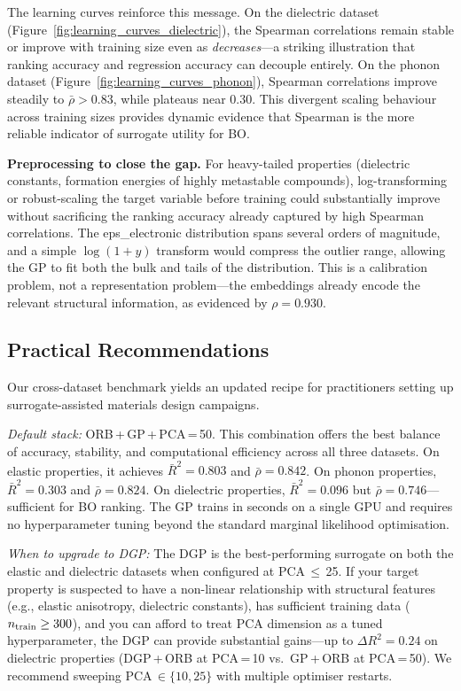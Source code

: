 The learning curves reinforce this message.
On the dielectric dataset (Figure~\ref{fig:learning_curves_dielectric}), the Spearman correlations remain stable or improve with training size even as \Rtwo{} \emph{decreases}---a striking illustration that ranking accuracy and regression accuracy can decouple entirely.
On the phonon dataset (Figure~\ref{fig:learning_curves_phonon}), Spearman correlations improve steadily to $\bar{\rho} > 0.83$, while \Rtwo{} plateaus near $0.30$.
This divergent scaling behaviour across training sizes provides dynamic evidence that Spearman is the more reliable indicator of surrogate utility for BO.

\textbf{Preprocessing to close the gap.}
For heavy-tailed properties (dielectric constants, formation energies of highly metastable compounds), log-transforming or robust-scaling the target variable before training could substantially improve \Rtwo{} without sacrificing the ranking accuracy already captured by high Spearman correlations.
The eps\_electronic distribution spans several orders of magnitude, and a simple $\log(1 + y)$ transform would compress the outlier range, allowing the GP to fit both the bulk and tails of the distribution.
This is a calibration problem, not a representation problem---the embeddings already encode the relevant structural information, as evidenced by $\rho = 0.930$.

\FloatBarrier
\subsection{Practical Recommendations}
\label{sec:practical_recommendations}

Our cross-dataset benchmark yields an updated recipe for practitioners setting up surrogate-assisted materials design campaigns.

\emph{Default stack:} ORB\,+\,GP\,+\,PCA\,=\,50.
This combination offers the best balance of accuracy, stability, and computational efficiency across all three datasets.
On elastic properties, it achieves $\bar{R}^2 = 0.803$ and $\bar{\rho} = 0.842$.
On phonon properties, $\bar{R}^2 = 0.303$ and $\bar{\rho} = 0.824$.
On dielectric properties, $\bar{R}^2 = 0.096$ but $\bar{\rho} = 0.746$---sufficient for BO ranking.
The GP trains in seconds on a single GPU and requires no hyperparameter tuning beyond the standard marginal likelihood optimisation.

\emph{When to upgrade to DGP:} The DGP is the best-performing surrogate on both the elastic and dielectric datasets when configured at PCA\,$\leq$\,25.
If your target property is suspected to have a non-linear relationship with structural features (e.g., elastic anisotropy, dielectric constants), has sufficient training data ($n_{\text{train}} \geq 300$), and you can afford to treat PCA dimension as a tuned hyperparameter, the DGP can provide substantial gains---up to $\Delta R^2 = 0.24$ on dielectric properties (DGP\,+\,ORB at PCA\,=\,10 vs.\ GP\,+\,ORB at PCA\,=\,50).
We recommend sweeping PCA\,$\in \{10, 25\}$ with multiple optimiser restarts.

